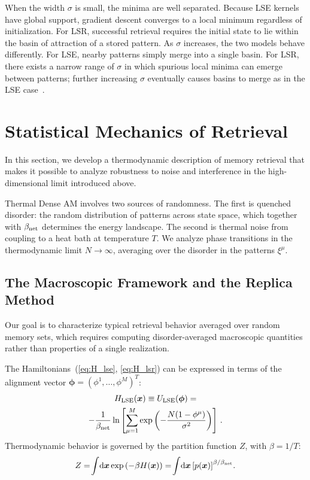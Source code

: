 \documentclass{article}
\newcommand{\dd}{{\mathrm{d}}}
\theoremstyle{plain}
\theoremstyle{definition}
\theoremstyle{remark}
\begin{document}
When the width $\sigma$ is small, the minima are well separated. Because LSE kernels have global support, gradient descent converges to a local minimum regardless of initialization. For LSR, successful retrieval requires the initial state to lie within the basin of attraction of a stored pattern. As $\sigma$ increases, the two models behave differently. For LSE, nearby patterns simply merge into a single basin. For LSR, there exists a narrow range of $\sigma$ in which spurious local minima can emerge between patterns; further increasing $\sigma$ eventually causes basins to merge as in the LSE case~\citep{hoover2025dense}.


\section{Statistical Mechanics of Retrieval}\label{sec:statmech}

In this section, we develop a thermodynamic description of memory retrieval that makes it possible to analyze robustness to noise and interference in the high-dimensional limit introduced above.

Thermal Dense AM involves two sources of randomness. The first is quenched disorder: the random distribution of patterns across state space, which together with $\beta_{\rm net}$ determines the energy landscape. The second is thermal noise from coupling to a heat bath at temperature $T$. We analyze phase transitions in the thermodynamic limit $N \to \infty$, averaging over the disorder in the patterns $\xi^\mu$.

\subsection{The Macroscopic Framework and the Replica Method}

Our goal is to characterize typical retrieval behavior averaged over random memory sets, which requires computing disorder-averaged macroscopic quantities rather than properties of a single realization.

The Hamiltonians~(\ref{eq:H_lse}, \ref{eq:H_lsr}) can be expressed in terms of the alignment vector $\bm{\phi} = (\phi^1, \dots, \phi^M)^T$:
\begin{multline}
    H_{\rm LSE}(\bm{x}) \equiv U_{\rm LSE}(\bm{\phi}) = \\ -\frac{1}{\beta_{\rm net}} \ln \left[ \sum_{\mu=1}^M \exp\left( -\frac{N(1 - \phi^\mu)}{\sigma^2} \right) \right]\,.
\end{multline}
Thermodynamic behavior is governed by the partition function $Z$, with $\beta = 1/T$:
\begin{equation}
    Z = \!\int\!\dd \bm{x} \exp\left( -\beta H(\bm{x}) \right) = \!\int\! \dd \bm{x} \left[ p(\bm{x}) \right]^{\beta/\beta_{\rm net}}\!.
    \label{eq:partition}
\end{equation}
\end{document}
